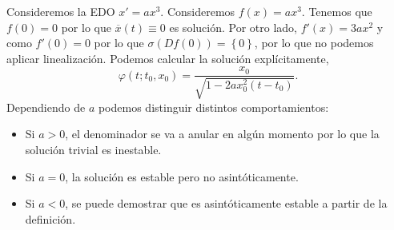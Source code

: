 \begin{eg}
	Consideremos la EDO $\displaystyle x ' = a x^{3} $. Consideremos $\displaystyle f\left(x\right)= ax^{3} $. Tenemos que $\displaystyle f\left(0\right)= 0 $ por lo que $\displaystyle \overline{x}\left(t\right)\equiv 0 $ es solución. Por otro lado, $\displaystyle f'\left(x\right)=3ax^{2} $ y como $\displaystyle f'\left(0\right)=0 $ por lo que $\displaystyle \sigma\left(Df\left(0\right)\right)= \left\{ 0\right\}  $, por lo que no podemos aplicar linealización. Podemos calcular la solución explícitamente, 
	\[\varphi\left(t; t_{0}, x_{0}\right)=\frac{x_{0}}{\sqrt{1-2ax^{2}_{0}\left(t-t_{0}\right)}} .\]
	Dependiendo de $\displaystyle a  $ podemos distinguir distintos comportamientos:
	\begin{itemize}
	\item Si $\displaystyle a > 0 $, el denominador se va a anular en algún momento por lo que la solución trivial es inestable. 
	\item Si $\displaystyle a = 0 $, la solución es estable pero no asintóticamente. 
	\item Si $\displaystyle a < 0 $, se puede demostrar que es asintóticamente estable a partir de la definición. 
	\end{itemize}
\end{eg}

